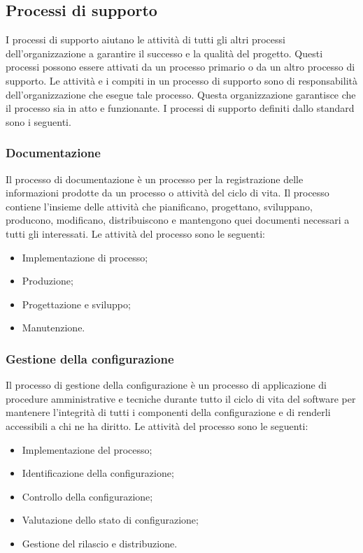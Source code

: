 \subsection{Processi di supporto}
I processi di supporto aiutano le attività di tutti gli altri processi dell'organizzazione a garantire il successo e la qualità del progetto. Questi processi possono essere attivati da un processo primario o da un altro processo di supporto.
Le attività e i compiti in un processo di supporto sono di responsabilità dell'organizzazione che esegue tale processo. Questa organizzazione garantisce che il processo sia in atto e funzionante.
I processi di supporto definiti dallo standard sono i seguenti.
\subsubsection{Documentazione}
Il processo di documentazione è un processo per la registrazione delle informazioni prodotte da un processo o attività del ciclo di vita. Il processo contiene l'insieme delle attività che pianificano, progettano, sviluppano, producono, modificano, distribuiscono e mantengono quei documenti necessari a tutti gli interessati.
Le attività del processo sono le seguenti:
\begin{itemize}
\item Implementazione di processo;
\item Produzione;
\item Progettazione e sviluppo;
\item Manutenzione.
\end{itemize}
\subsubsection{Gestione della configurazione}
Il processo di gestione della configurazione è un processo di applicazione di procedure amministrative e tecniche durante tutto il ciclo di vita del software per mantenere l'integrità di tutti i componenti della configurazione e di renderli accessibili a chi ne ha diritto.
Le attività del processo sono le seguenti:
\begin{itemize}
\item Implementazione del processo;
\item Identificazione della configurazione;
\item Controllo della configurazione;
\item Valutazione dello stato di configurazione;
\item Gestione del rilascio e distribuzione.
\end{itemize}

